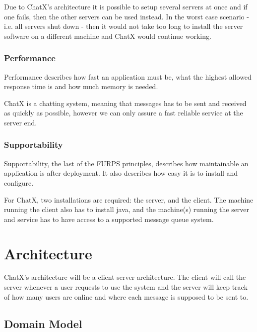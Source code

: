 Due to ChatX's architecture it is possible to setup several servers at once and if one fails, then the other servers can be used instead. In the worst case scenario - i.e. all servers shut down - then it would not take too long to install the server software on a different machine and ChatX would continue working.

\subsubsection{Performance}Performance describes how fast an application must be, what the highest allowed response time is and how much memory is needed. 

ChatX is a chatting system, meaning that messages has to be sent and received as quickly as possible, however we can only assure a fast reliable service at the server end.

\subsubsection{Supportability}
Supportability, the last of the FURPS principles, describes how maintainable an application is after deployment. It also describes how easy it is to install and configure. 

For ChatX, two installations are required: the server, and the client. The machine running the client also has to install java, and the machine(s) running the server and service has to have access to a supported message queue system.
 

\section{Architecture}
ChatX's architecture will be a client-server architecture. The client will call the server whenever a user requests to use the system and the server will keep track of how many users are online and where each message is supposed to be sent to.

\subsection{Domain Model}

